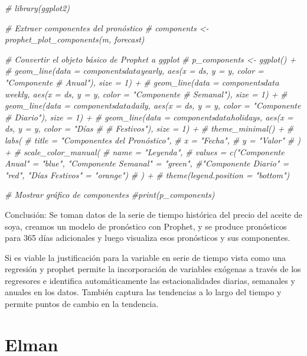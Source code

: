 \documentclass[
]{book}
\newenvironment{Shaded}{\begin{snugshade}}{\end{snugshade}}
\newcommand{\CommentTok}[1]{\textcolor[rgb]{0.56,0.35,0.01}{\textit{#1}}}
\begin{document}
\begin{Shaded}
\begin{Highlighting}[]
\CommentTok{\# library(ggplot2)}

\CommentTok{\# Extraer componentes del pronóstico}
\CommentTok{\# components \textless{}{-} prophet\_plot\_components(m, forecast)}

\CommentTok{\# Convertir el objeto básico de Prophet a ggplot}
\CommentTok{\# p\_components \textless{}{-} ggplot() +}
\CommentTok{\#  geom\_line(data = components$data$yearly, aes(x = ds, y = y, color = "Componente \# Anual"), size = 1) +}
\CommentTok{\#  geom\_line(data = components$data$weekly, aes(x = ds, y = y, color = "Componente \# Semanal"), size = 1) +}
\CommentTok{\#  geom\_line(data = components$data$daily, aes(x = ds, y = y, color = "Componente \# Diario"), size = 1) +}
\CommentTok{\#  geom\_line(data = components$data$holidays, aes(x = ds, y = y, color = "Días \# \# Festivos"), size = 1) +}
\CommentTok{\#  theme\_minimal() +}
\CommentTok{\#  labs(}
\CommentTok{\#    title = "Componentes del Pronóstico",}
\CommentTok{\#    x = "Fecha",}
\CommentTok{\#    y = "Valor"}
\CommentTok{\#  ) +}
\CommentTok{\#  scale\_color\_manual(}
\CommentTok{\#    name = "Leyenda",}
\CommentTok{\#    values = c("Componente Anual" = "blue", "Componente Semanal" = "green", \#"Componente Diario" = "red", "Días Festivos" = "orange")}
\CommentTok{\#  ) +}
\CommentTok{\#  theme(legend.position = "bottom")}

\CommentTok{\# Mostrar gráfico de componentes}
\CommentTok{\#print(p\_components)}
\end{Highlighting}
\end{Shaded}

Conclusión: Se toman datos de la serie de tiempo histórica del precio del aceite de soya, creamos un modelo de pronóstico con Prophet, y se produce pronósticos para 365 días adicionales y luego visualiza esos pronósticos y sus componentes.

Si es viable la justificación para la variable en serie de tiempo vista como una regresión y prophet permite la incorporación de variables exógenas a través de los regresores e identifica automáticamente las estacionalidades diarias, semanales y anuales en los datos. También captura las tendencias a lo largo del tiempo y permite puntos de cambio en la tendencia.

\hypertarget{elman}{%
\chapter{Elman}\label{elman}}
\end{document}
